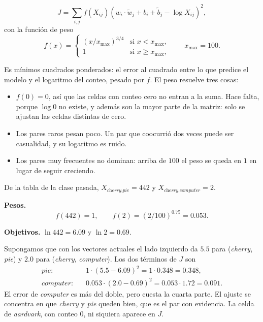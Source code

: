 \documentclass[11pt,letterpaper]{article}
\begin{document}
\begin{definicion}
    \[
        J = \sum_{i, j} f(X_{ij})
            \left( w_i \cdot \tilde{w}_j + b_i + \tilde{b}_j
                   - \log X_{ij} \right)^2 ,
    \]
    con la función de peso
    \[
        f(x) = \begin{cases}
                   (x / x_{\max})^{3/4} & \text{si } x < x_{\max} , \\
                   1 & \text{si } x \ge x_{\max} ,
               \end{cases}
        \qquad x_{\max} = 100 .
    \]
\end{definicion}

Es mínimos cuadrados ponderados: el error al cuadrado entre lo que
predice el modelo y el logaritmo del conteo, pesado por $f$. El peso
resuelve tres cosas:

\begin{itemize}[itemsep=0.3em]
    \item $f(0) = 0$, así que las celdas con conteo cero no entran a la
          suma. Hace falta, porque $\log 0$ no existe, y además son la
          mayor parte de la matriz: solo se ajustan las celdas
          distintas de cero.
    \item Los pares raros pesan poco. Un par que coocurrió dos veces
          puede ser casualidad, y su logaritmo es ruido.
    \item Los pares muy frecuentes no dominan: arriba de $100$ el peso
          se queda en $1$ en lugar de seguir creciendo.
\end{itemize}

\begin{ejemplo}
    De la tabla de la clase pasada,
    $X_{\textit{cherry}, \textit{pie}} = 442$ y
    $X_{\textit{cherry}, \textit{computer}} = 2$.

    \textbf{Pesos.}
    \[
        f(442) = 1 , \qquad
        f(2) = (2 / 100)^{0.75} = 0.053 .
    \]

    \textbf{Objetivos.} $\ln 442 = 6.09$ y $\ln 2 = 0.69$.

    Supongamos que con los vectores actuales el lado izquierdo da
    $5.5$ para (\textit{cherry}, \textit{pie}) y $2.0$ para
    (\textit{cherry}, \textit{computer}). Los dos términos de $J$ son
    \begin{align*}
        \textit{pie:}      &\quad 1 \cdot (5.5 - 6.09)^2
                            = 1 \cdot 0.348 = 0.348 , \\
        \textit{computer:} &\quad 0.053 \cdot (2.0 - 0.69)^2
                            = 0.053 \cdot 1.72 = 0.091 .
    \end{align*}
    El error de \textit{computer} es más del doble, pero cuesta la
    cuarta parte. El ajuste se concentra en que \textit{cherry} y
    \textit{pie} queden bien, que es el par con evidencia. La celda de
    \textit{aardvark}, con conteo $0$, ni siquiera aparece en $J$.
\end{ejemplo}
\end{document}
